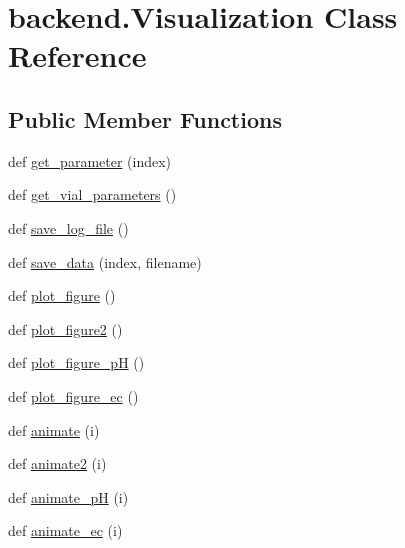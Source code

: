 \hypertarget{classbackend_1_1Visualization}{}\section{backend.\+Visualization Class Reference}
\label{classbackend_1_1Visualization}
\subsection*{Public Member Functions}
\begin{DoxyCompactItemize}
\item 
def \hyperlink{classbackend_1_1Visualization_a1ddce492652885eec4ca88268e96ebab_a1ddce492652885eec4ca88268e96ebab}{get\+\_\+parameter} (index)
\item 
def \hyperlink{classbackend_1_1Visualization_a8afefb6f1785a15f87ee0ccba4429db9_a8afefb6f1785a15f87ee0ccba4429db9}{get\+\_\+vial\+\_\+parameters} ()
\item 
def \hyperlink{classbackend_1_1Visualization_a19943c0c133c66353ecb0129ee490aeb_a19943c0c133c66353ecb0129ee490aeb}{save\+\_\+log\+\_\+file} ()
\item 
def \hyperlink{classbackend_1_1Visualization_a574922c835063b7f555fc2c57e231dcb_a574922c835063b7f555fc2c57e231dcb}{save\+\_\+data} (index, filename)
\item 
def \hyperlink{classbackend_1_1Visualization_ae4a54d3ffecac64d5cc7e1b116a8b453_ae4a54d3ffecac64d5cc7e1b116a8b453}{plot\+\_\+figure} ()
\item 
def \hyperlink{classbackend_1_1Visualization_a3f8d471ad9c547ce99d1cb6df2ead3ff_a3f8d471ad9c547ce99d1cb6df2ead3ff}{plot\+\_\+figure2} ()
\item 
def \hyperlink{classbackend_1_1Visualization_a8e602dcd5cf032f607293402f7307f58_a8e602dcd5cf032f607293402f7307f58}{plot\+\_\+figure\+\_\+pH} ()
\item 
def \hyperlink{classbackend_1_1Visualization_aa77270cd5c2d85be88281a0a2a51e965_aa77270cd5c2d85be88281a0a2a51e965}{plot\+\_\+figure\+\_\+ec} ()
\item 
def \hyperlink{classbackend_1_1Visualization_a8786183f4482b87a89c80d7163ec8038_a8786183f4482b87a89c80d7163ec8038}{animate} (i)
\item 
def \hyperlink{classbackend_1_1Visualization_a5c623da4f55407d6f6838bc85cb0b57b_a5c623da4f55407d6f6838bc85cb0b57b}{animate2} (i)
\item 
def \hyperlink{classbackend_1_1Visualization_aa35b6da1761f7829c9d703a035dee838_aa35b6da1761f7829c9d703a035dee838}{animate\+\_\+pH} (i)
\item 
def \hyperlink{classbackend_1_1Visualization_a877940d58679d6f81ff18560e5bf70b2_a877940d58679d6f81ff18560e5bf70b2}{animate\+\_\+ec} (i)
\end{DoxyCompactItemize}


